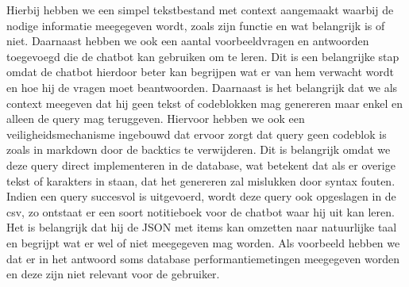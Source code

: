 Hierbij hebben we een simpel tekstbestand met context aangemaakt waarbij de nodige informatie meegegeven wordt, zoals zijn functie en wat belangrijk is of niet.
Daarnaast hebben we ook een aantal voorbeeldvragen en antwoorden toegevoegd die de chatbot kan gebruiken om te leren.
Dit is een belangrijke stap omdat de chatbot hierdoor beter kan begrijpen wat er van hem verwacht wordt en hoe hij de vragen moet beantwoorden.
Daarnaast is het belangrijk dat we als context meegeven dat hij geen tekst of codeblokken mag genereren maar enkel en alleen de query mag teruggeven.
Hiervoor hebben we ook een veiligheidsmechanisme ingebouwd dat ervoor zorgt dat query geen codeblok is zoals in markdown door de backtics te verwijderen.
Dit is belangrijk omdat we deze query direct implementeren in de database, wat betekent dat als er overige tekst of karakters in staan, dat het genereren zal mislukken door syntax fouten.
Indien een query succesvol is uitgevoerd, wordt deze query ook opgeslagen in de csv, zo ontstaat er een soort notitieboek voor de chatbot waar hij uit kan leren.
Het is belangrijk dat hij de JSON met items kan omzetten naar natuurlijke taal en begrijpt wat er wel of niet meegegeven mag worden.
Als voorbeeld hebben we dat er in het antwoord soms database performantiemetingen meegegeven worden en deze zijn niet relevant voor de gebruiker.
